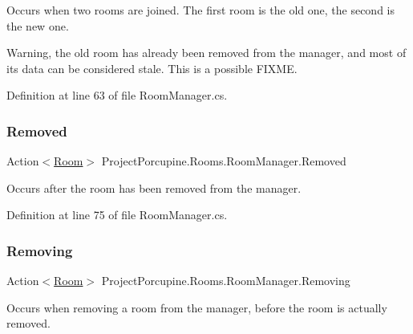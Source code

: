 Occurs when two rooms are joined. The first room is the old one, the second is the new one. 

Warning, the old room has already been removed from the manager, and most of its data can be considered stale. This is a possible F\+I\+X\+ME. 

Definition at line 63 of file Room\+Manager.\+cs.

\mbox{\label{class_project_porcupine_1_1_rooms_1_1_room_manager_af499628911e02ea630620f63c2dec68d}} 
\subsubsection{\texorpdfstring{Removed}{Removed}}
{\footnotesize\ttfamily Action$<$\hyperlink{class_project_porcupine_1_1_rooms_1_1_room}{Room}$>$ Project\+Porcupine.\+Rooms.\+Room\+Manager.\+Removed}



Occurs after the room has been removed from the manager. 



Definition at line 75 of file Room\+Manager.\+cs.

\mbox{\label{class_project_porcupine_1_1_rooms_1_1_room_manager_ab886414089e90a69275832444a3e6c66}} 
\subsubsection{\texorpdfstring{Removing}{Removing}}
{\footnotesize\ttfamily Action$<$\hyperlink{class_project_porcupine_1_1_rooms_1_1_room}{Room}$>$ Project\+Porcupine.\+Rooms.\+Room\+Manager.\+Removing}



Occurs when removing a room from the manager, before the room is actually removed. 



